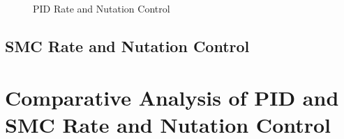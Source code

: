 \begin{figure}[H]
  \centerline{}
  \caption{PID Rate and Nutation Control}
  \label{fig:PNutationRateControl}
\end{figure}

\subsection{SMC Rate and Nutation Control}
\label{subsec:SMC}


\section{Comparative Analysis of PID and SMC Rate and Nutation Control}
\label{sec:ComparativeAnalysisofPIDandSMCRateandNutationControl}

